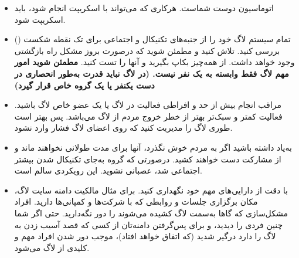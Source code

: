 \begin{itemize}

\item
اتوماسیون دوست شماست. هرکاری که می‌تواند با اسکریپت انجام شود،
باید اسکریپت شود.

\item
تمام سیستم لاگ خود را از جنبه‌های تکنیکال و اجتماعی برای تک نقطه شکست
()
بررسی کنید. تلاش کنید و مطمئن شوید که درصورت بروز مشکل راه بازگشتی وجود خواهد داشت.
از همه‌چیز بکاپ بگیرید و آنها را تست کنید.
{\bfseries
مطمئن شوید امور مهم لاگ فقط وابسته به یک نفر نیست.
(در لاگ نباید قدرت به‌طور انحصاری در دست یکنفر یا یک گروه خاص قرار گیرد)
}

\item
مراقب انجام بیش از حد و افراطی فعالیت در لاگ یا یک عضو خاص لاگ باشید.
فعالیت کمتر و سبک‌تر بهتر از خطر خروج مردم از لاگ می‌باشد.
پس بهتر است طوری لاگ را مدیریت کنید که روی اعضای لاگ فشار وارد نشود.

\item
به‌یاد داشته باشید اگر به مردم خوش نگذرد، آنها برای مدت طولانی
نخواهند ماند و از مشارکت دست خواهند کشید. درصورتی که گروه به‌جای تکنیکال شدن
بیشتر اجتماعی شد، عصبانی نشوید. این رویکردی سالم است.

\item
با دقت از دارایی‌های مهم خود نگهداری کنید. برای مثال مالکیت دامنه سایت لاگ،
مکان برگزاری جلسات و روابطی که با شرکت‌ها و کمپانی‌ها دارید.
افراد مشکل‌سازی که گاها به‌سمت لاگ کشیده می‌شوند را دور نگه‌دارید.
حتی اگر شما چنین فردی را دیدید، و برای پس‌گرفتن دامنه‌تان از کسی که قصد آسیب زدن به
لاگ را دارد درگیر شدید (که اتفاق خواهد افتاد)، موجب دور شدن افراد مهم و کلیدی از لاگ می‌شود.
\end{itemize}

